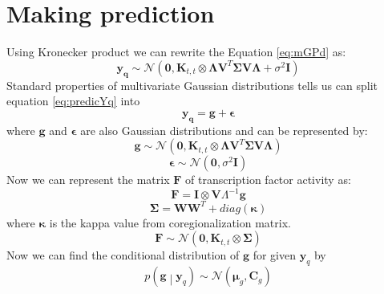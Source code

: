 \section{Making prediction}
Using Kronecker product we can rewrite the Equation \ref{eq:mGPd} as:
\begin{equation} \label{eq:predicYq}
  \mathbf{y_q}  \sim \mathcal{N} \left( \mathbf{0}, 
    \mathbf{K}_{t,t} \otimes \boldsymbol{\Lambda} \mathbf{V}^T\boldsymbol{\Sigma} \mathbf{V} \boldsymbol{\Lambda} +
    \sigma^2\mathbf{I}\right)
\end{equation}
Standard properties of multivariate Gaussian distributions tells us can split equation \ref{eq:predicYq} into
\begin{equation} \label{eq:gEp}
  \mathbf{y_q} = \mathbf{g} + \boldsymbol{\epsilon}
\end{equation}
where $\mathbf{g}$ and $\boldsymbol{\epsilon}$ are also Gaussian distributions and can be represented by:
\begin{equation}\label{eq:g}
  \mathbf{g} \sim \mathcal{N} \left( \mathbf{0}, 
    \mathbf{K}_{t,t} \otimes 
    \boldsymbol{\Lambda} \mathbf{V}^T\boldsymbol{\Sigma} \mathbf{V} \boldsymbol{\Lambda} \right)
\end{equation}
\begin{equation}\label{eq:Epsi}
  \boldsymbol{\epsilon} \sim \mathcal{N} \left(\mathbf{0},\sigma^2\mathbf{I}\right)
\end{equation}
Now we can represent the matrix $\mathbf{F}$ of transcription factor activity as:
\begin{equation}\label{eq:F}
  \mathbf{F} = \mathbf{I} \otimes \mathbf{V} \Lambda^{-1} \mathbf{g}
\end{equation}
\begin{equation}\label{eq:Sigma}
  \boldsymbol{\Sigma} = \mathbf{W}\mathbf{W}^T + diag\left(\boldsymbol{\kappa}\right)
\end{equation}
where $\boldsymbol{\kappa}$ is the kappa value from coregionalization matrix.
\begin{equation} \label{eq:predictionF}
  \mathbf{F}  \sim \mathcal{N} \left( \mathbf{0},\mathbf{K}_{t,t} \otimes \boldsymbol{\Sigma}\right)
\end{equation}
Now we can find the conditional distribution of $\mathbf{g}$ for given $\mathbf{y}_q$ by
\begin{equation}\label{eq:gGivenYq}
 p\left(\mathbf{g} \middle| \mathbf{y}_q\right) \sim 
    \mathcal{N} \left( \boldsymbol{\mu}_g, \mathbf{C}_g\right)
\end{equation}
